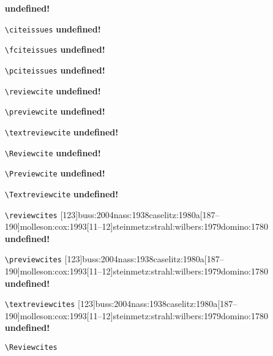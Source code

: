 \documentclass[a4paper,12pt]{scrartcl}
\newcommand*{\Befehl}[1]{\texttt{\textbackslash#1}}
\begin{document}
\begin{enumerate}
        {\textbf{undefined!}}%
	\item[\footnotesize\Befehl{citeissues}] 
        {}
        {\textbf{undefined!}}%
	\item[\footnotesize\Befehl{fciteissues}] 
        {}
        {\textbf{undefined!}}%
	\item[\footnotesize\Befehl{pciteissues}] 
        {}
        {\textbf{undefined!}}%
	\item[\footnotesize\Befehl{reviewcite}] 
        {}
        {\textbf{undefined!}}%
	\item[\footnotesize\Befehl{previewcite}] 
        {}
        {\textbf{undefined!}}%
	\item[\footnotesize\Befehl{textreviewcite}] 
        {}
        {\textbf{undefined!}}%
	\item[\footnotesize\Befehl{Reviewcite}] 
        {}
        {\textbf{undefined!}}%
	\item[\footnotesize\Befehl{Previewcite}] 
        {}
        {\textbf{undefined!}}%
	\item[\footnotesize\Befehl{Textreviewcite}] 
        {}
        {\textbf{undefined!}}%
	\item[\footnotesize\Befehl{reviewcites}] 
        {[123]{buss:2004}{nass:1938}{caselitz:1980a}[187--190]{molleson:cox:1993}[11--12]{steinmetz:strahl:wilbers:1979}{domino:1780}}
        {\textbf{undefined!}}%
	\item[\footnotesize\Befehl{previewcites}] 
        {[123]{buss:2004}{nass:1938}{caselitz:1980a}[187--190]{molleson:cox:1993}[11--12]{steinmetz:strahl:wilbers:1979}{domino:1780}}
        {\textbf{undefined!}}%
	\item[\footnotesize\Befehl{textreviewcites}] 
        {[123]{buss:2004}{nass:1938}{caselitz:1980a}[187--190]{molleson:cox:1993}[11--12]{steinmetz:strahl:wilbers:1979}{domino:1780}}
        {\textbf{undefined!}}%
	\item[\footnotesize\Befehl{Reviewcites}] 

\end{enumerate}
\end{document}
